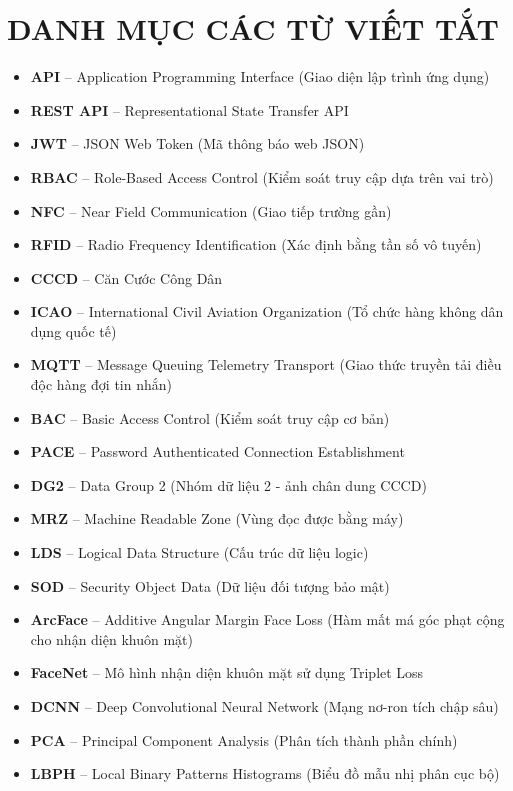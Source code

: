 \documentclass[DoAn.tex]{subfiles}
\begin{document}
\chapter*{DANH MỤC CÁC TỪ VIẾT TẮT}
\begin{itemize}
    \item \textbf{API} -- Application Programming Interface (Giao diện lập trình ứng dụng)
    \item \textbf{REST API} -- Representational State Transfer API
    \item \textbf{JWT} -- JSON Web Token (Mã thông báo web JSON)
    \item \textbf{RBAC} -- Role-Based Access Control (Kiểm soát truy cập dựa trên vai trò)
    \item \textbf{NFC} -- Near Field Communication (Giao tiếp trường gần)
    \item \textbf{RFID} -- Radio Frequency Identification (Xác định bằng tần số vô tuyến)
    \item \textbf{CCCD} -- Căn Cước Công Dân
    \item \textbf{ICAO} -- International Civil Aviation Organization (Tổ chức hàng không dân dụng quốc tế)
    \item \textbf{MQTT} -- Message Queuing Telemetry Transport (Giao thức truyền tải điều độc hàng đợi tin nhắn)
    \item \textbf{BAC} -- Basic Access Control (Kiểm soát truy cập cơ bản)
    \item \textbf{PACE} -- Password Authenticated Connection Establishment
    \item \textbf{DG2} -- Data Group 2 (Nhóm dữ liệu 2 - ảnh chân dung CCCD)
    \item \textbf{MRZ} -- Machine Readable Zone (Vùng đọc được bằng máy)
    \item \textbf{LDS} -- Logical Data Structure (Cấu trúc dữ liệu logic)
    \item \textbf{SOD} -- Security Object Data (Dữ liệu đối tượng bảo mật)
    \item \textbf{ArcFace} -- Additive Angular Margin Face Loss (Hàm mất má góc phạt cộng cho nhận diện khuôn mặt)
    \item \textbf{FaceNet} -- Mô hình nhận diện khuôn mặt sử dụng Triplet Loss
    \item \textbf{DCNN} -- Deep Convolutional Neural Network (Mạng nơ-ron tích chập sâu)
    \item \textbf{PCA} -- Principal Component Analysis (Phân tích thành phần chính)
    \item \textbf{LBPH} -- Local Binary Patterns Histograms (Biểu đồ mẫu nhị phân cục bộ)

\end{itemize}
\end{document}
